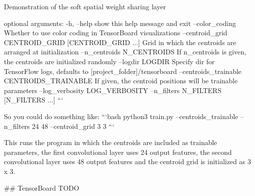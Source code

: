 Demonstration of the soft spatial weight sharing layer

optional arguments:
  -h, --help            show this help message and exit
  --color_coding        Whether to use color coding in TensorBoard
                        visualizations
  --centroid_grid CENTROID_GRID [CENTROID_GRID ...]
                        Grid in which the centroids are arranged at
                        initialization
  --n_centroids N_CENTROIDS
                        If n_centroids is given, the centroids are initialized
                        randomly
  --logdir LOGDIR       Specify dir for TensorFlow logs, defaults to [project_folder]/tensorboard
  --centroids_trainable CENTROIDS_TRAINABLE
                        If given, the centroid positions will be trainable
                        parameters
  --log_verbosity LOG_VERBOSITY
  --n_filters N_FILTERS [N_FILTERS ...]
```

So you could do something like:
```bash
python3 train.py --centroids_trainable  --n_filters 24 48 --centroid_grid 3 3
```

This runs the program in which the centroids are included as trainable parameters, the first convolutional layer uses
24 output features, the second convolutional layer uses 48 output features and the centroid grid is initialized as 3 x 3.

## TensorBoard
TODO